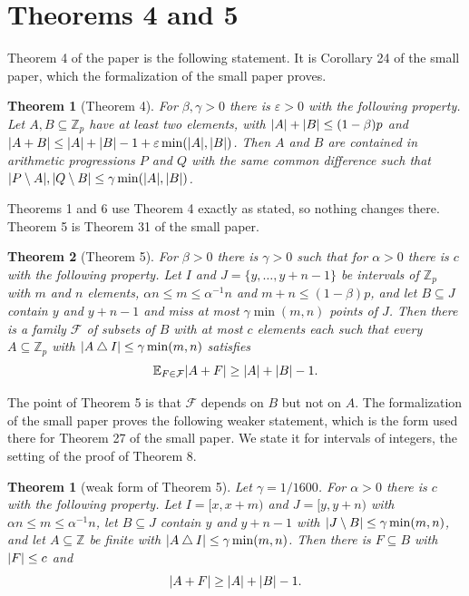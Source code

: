 \documentclass[11pt]{amsart}
\newtheorem{theorem}{Theorem}
\newtheorem*{theorem*}{Theorem}
\theoremstyle{remark}
\newcommand{\Z}{\mathbb{Z}}
\newcommand{\E}{\mathbb{E}}
\DeclarePairedDelimiter{\abs}{\lvert}{\rvert}
\begin{document}
\section{Theorems 4 and 5}

Theorem 4 of the paper is the following statement. It is Corollary 24 of the small paper, which
the formalization of the small paper proves.

\begin{theorem*}[Theorem 4]
For $\beta, \gamma > 0$ there is $\varepsilon > 0$ with the following property. Let
$A, B \subseteq \Z_p$ have at least two elements, with $\abs{A} + \abs{B} \le (1 - \beta) p$ and
$\abs{A + B} \le \abs{A} + \abs{B} - 1 + \varepsilon \min(\abs{A}, \abs{B})$. Then $A$ and $B$
are contained in arithmetic progressions $P$ and $Q$ with the same common difference such that
$\abs{P \setminus A}, \abs{Q \setminus B} \le \gamma \min(\abs{A}, \abs{B})$.
\end{theorem*}

Theorems 1 and 6 use Theorem 4 exactly as stated, so nothing changes there. Theorem 5 is Theorem
31 of the small paper.

\begin{theorem*}[Theorem 5]
For $\beta > 0$ there is $\gamma > 0$ such that for $\alpha > 0$ there is $c$ with the following
property. Let $I$ and $J = \{y, \dots, y + n - 1\}$ be intervals of $\Z_p$ with $m$ and $n$
elements, $\alpha n \le m \le \alpha^{-1} n$ and $m + n \le (1 - \beta) p$, and let
$B \subseteq J$ contain $y$ and $y + n - 1$ and miss at most $\gamma \min(m, n)$ points of $J$.
Then there is a family $\mathcal F$ of subsets of $B$ with at most $c$ elements each such that
every $A \subseteq \Z_p$ with $\abs{A \mathbin{\triangle} I} \le \gamma \min(m, n)$ satisfies
\[
  \E_{F \in \mathcal F} \abs{A + F} \ge \abs{A} + \abs{B} - 1 .
\]
\end{theorem*}

The point of Theorem 5 is that $\mathcal F$ depends on $B$ but not on $A$. The formalization of
the small paper proves the following weaker statement, which is the form used there for Theorem
27 of the small paper. We state it for intervals of integers, the setting of the proof of
Theorem 8.

\begin{theorem}[weak form of Theorem 5]\label{thm:weak5}
Let $\gamma = 1/1600$. For $\alpha > 0$ there is $c$ with the following property. Let
$I = [x, x + m)$ and $J = [y, y + n)$ with $\alpha n \le m \le \alpha^{-1} n$, let $B \subseteq J$
contain $y$ and $y + n - 1$ with $\abs{J \setminus B} \le \gamma \min(m, n)$, and let
$A \subseteq \Z$ be finite with $\abs{A \mathbin{\triangle} I} \le \gamma \min(m, n)$. Then there
is $F \subseteq B$ with $\abs{F} \le c$ and
\[
  \abs{A + F} \ge \abs{A} + \abs{B} - 1 .
\]
\end{theorem}
\end{document}
